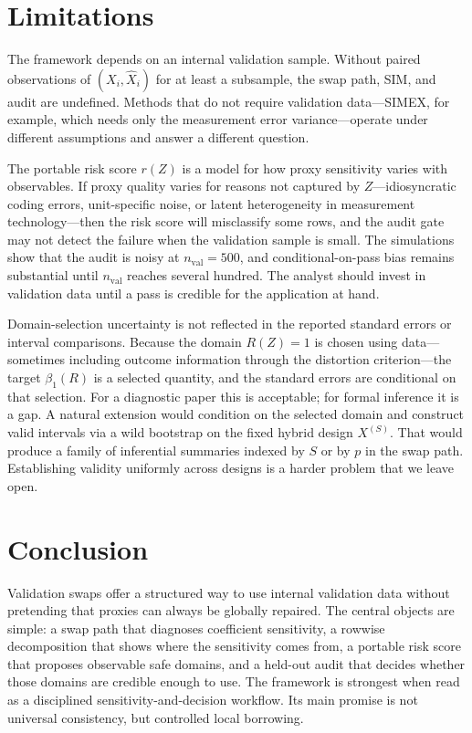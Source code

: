\documentclass[11pt]{article}
\newcommand{\1}{\mathbf{1}}
\begin{document}
\section{Limitations}

The framework depends on an internal validation sample. Without paired observations of $(X_i, \hat X_i)$ for at least a subsample, the swap path, SIM, and audit are undefined. Methods that do not require validation data---SIMEX, for example, which needs only the measurement error variance---operate under different assumptions and answer a different question.

The portable risk score $r(Z)$ is a model for how proxy sensitivity varies with observables. If proxy quality varies for reasons not captured by $Z$---idiosyncratic coding errors, unit-specific noise, or latent heterogeneity in measurement technology---then the risk score will misclassify some rows, and the audit gate may not detect the failure when the validation sample is small. The simulations show that the audit is noisy at $n_{\mathrm{val}}=500$, and conditional-on-pass bias remains substantial until $n_{\mathrm{val}}$ reaches several hundred. The analyst should invest in validation data until a pass is credible for the application at hand.

Domain-selection uncertainty is not reflected in the reported standard errors or interval comparisons. Because the domain $R(Z)=1$ is chosen using data---sometimes including outcome information through the distortion criterion---the target $\beta_1(R)$ is a selected quantity, and the standard errors are conditional on that selection. For a diagnostic paper this is acceptable; for formal inference it is a gap. A natural extension would condition on the selected domain and construct valid intervals via a wild bootstrap on the fixed hybrid design $X^{(S)}$. That would produce a family of inferential summaries indexed by $S$ or by $p$ in the swap path. Establishing validity uniformly across designs is a harder problem that we leave open.

\section{Conclusion}

Validation swaps offer a structured way to use internal validation data without pretending that proxies can always be globally repaired. The central objects are simple: a swap path that diagnoses coefficient sensitivity, a rowwise decomposition that shows where the sensitivity comes from, a portable risk score that proposes observable safe domains, and a held-out audit that decides whether those domains are credible enough to use. The framework is strongest when read as a disciplined sensitivity-and-decision workflow. Its main promise is not universal consistency, but controlled local borrowing.
\end{document}
